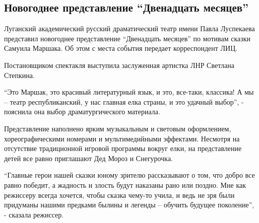  
 
 
 
 
\subsection{Новогоднее представление \enquote{Двенадцать месяцев}}
\label{sec:18_12_2021.stz.news.lnr.lug_info.1.novyj_god_teatr}



Луганский академический русский драматический театр имени Павла Луспекаева
представил новогоднее представление \enquote{Двенадцать месяцев} по мотивам сказки
Самуила Маршака. Об этом с места события передает корреспондент ЛИЦ.


Постановщиком спектакля выступила заслуженная артистка ЛНР Светлана Степкина.

\enquote{Это Маршак, это красивый литературный язык, и это, все-таки, классика! А мы –
театр республиканский, у нас главная елка страны, и это удачный выбор}, -
пояснила она выбор драматургического материала.


Представление наполнено ярким музыкальным и световым оформлением,
хореографическими номерами и мультимедийными эффектами. Несмотря на отсутствие
традиционной игровой программы вокруг елки, на представление детей все равно
приглашают Дед Мороз и Снегурочка.


\enquote{Главные герои нашей сказки юному зрителю рассказывают о том, что добро все
равно победит, а жадность и злость будут наказаны рано или поздно. Мне как
режиссеру всегда хочется, чтобы сказка чему-то учила, и ведь не зря были
придуманы нашими предками былины и легенды – обучить будущее поколение}, -
сказала режиссер.

